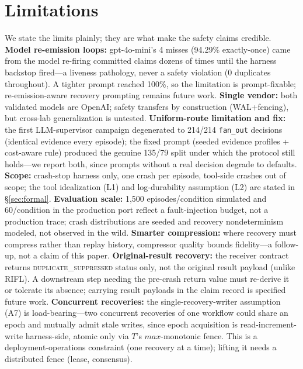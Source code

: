 \documentclass[10pt,journal,compsoc]{IEEEtran}
\begin{document}
\section{Limitations}
\label{sec:limitations}

We state the limits plainly; they are what make the safety
claims credible. \textbf{Model re-emission loops:}
gpt-4o-mini's 4 misses (94.29\% exactly-once) came from the
model re-firing committed claims dozens of times until the
harness backstop fired---a liveness pathology, never a safety
violation (0 duplicates throughout). A tighter prompt reached
100\%, so the limitation is prompt-fixable; re-emission-aware
recovery prompting remains future work.
\textbf{Single vendor:} both validated models are OpenAI;
safety transfers by construction (WAL+fencing), but cross-lab
generalization is untested. \textbf{Uniform-route limitation
and fix:} the first LLM-supervisor campaign degenerated to
214/214 \texttt{fan\_out} decisions (identical evidence every
episode); the fixed prompt (seeded evidence profiles +
cost-aware rule) produced the genuine 135/79 split under which
the protocol still holds---we report both, since prompts without
a real decision degrade to defaults. \textbf{Scope:}
crash-stop harness only, one crash per episode, tool-side
crashes out of scope; the tool idealization (L1) and
log-durability assumption (L2) are stated in
\S\ref{sec:formal}. \textbf{Evaluation scale:} 1,500
episodes/condition simulated and 60/condition in the
production port reflect a fault-injection budget, not a
production trace; crash distributions are seeded and recovery
nondeterminism modeled, not observed in the wild.
\textbf{Smarter compression:} where recovery must compress
rather than replay history, compressor quality bounds
fidelity---a follow-up, not a claim of this paper.
\textbf{Original-result recovery:} the receiver contract
returns \textsc{duplicate\_suppressed} status only, not the
original result payload (unlike RIFL). A downstream step needing
the pre-crash return value must re-derive it or tolerate its
absence; carrying result payloads in the claim record is
specified future work.
\textbf{Concurrent recoveries:} the single-recovery-writer
assumption (A7) is load-bearing---two concurrent recoveries of
one workflow could share an epoch and mutually admit stale
writes, since epoch acquisition is read-increment-write
harness-side, atomic only via $T$'s $\mathit{max}$-monotonic
fence. This is a deployment-operations constraint (one recovery
at a time); lifting it needs a distributed fence (lease,
consensus).
\end{document}
